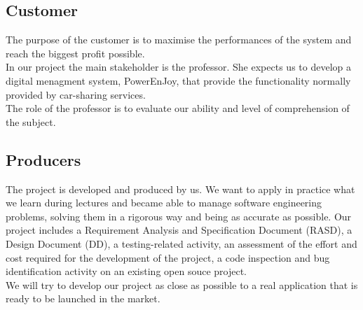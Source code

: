 \subsection{Customer}%
 The purpose of the customer is to maximise the performances of the system and reach the biggest profit possible.
\\In our project the main stakeholder is the professor. She expects us to develop a digital menagment system, PowerEnJoy, that provide the functionality normally provided by car-sharing services.  
\\The role of the professor is to evaluate our ability and level of comprehension of the subject. 
\subsection{Producers}
The project is developed and produced by us. We want to apply in practice what we learn during lectures and became able to manage software engineering problems, solving them in a rigorous way and being as accurate as possible. Our project includes a Requirement Analysis and Specification Document (RASD), a Design Document (DD), a testing-related activity, an
assessment of the effort and cost required for the development of the project, a code inspection and bug identification activity on an existing open souce project. 
\\We will try to develop our project as close as possible to a real application that is ready to be launched in the market.